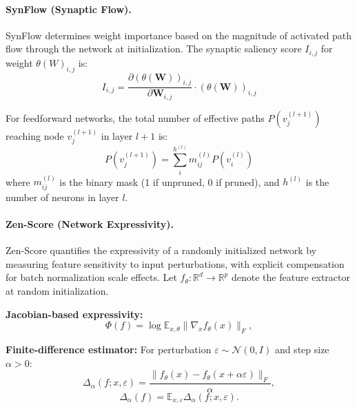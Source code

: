 \paragraph{SynFlow (Synaptic Flow). \cite{tanaka2020pruning}}
SynFlow \cite{tanaka2020pruning} determines weight importance based on the magnitude of activated path flow through the network at initialization. The synaptic saliency score $I_{i,j}$ for weight $\theta(W)_{i,j}$ is:
\begin{equation}
	I_{i,j} = \frac{\partial (\theta(\mathbf{W}))_{i,j}}{\partial \mathbf{W}_{i,j}} \cdot (\theta(\mathbf{W}))_{i,j}
\end{equation}

For feedforward networks, the total number of effective paths $P(v^{(l+1)}_j)$ reaching node $v^{(l+1)}_j$ in layer $l+1$ is:
\begin{equation}
	P(v^{(l+1)}_j) = \sum_{i}^{h^{(l)}} m^{(l)}_{ij} P(v^{(l)}_i)
\end{equation}
where $m^{(l)}_{ij}$ is the binary mask (1 if unpruned, 0 if pruned), and $h^{(l)}$ is the number of neurons in layer $l$.

\paragraph{Zen-Score (Network Expressivity). \cite{lin2021zen}}
Zen-Score \cite{lin2021zen} quantifies the expressivity of a randomly initialized network by measuring feature sensitivity to input perturbations, with explicit compensation for batch normalization scale effects. Let $f_\theta:\mathbb{R}^d\to\mathbb{R}^p$ denote the feature extractor at random initialization. 

\textbf{Jacobian-based expressivity:}
\begin{equation}\label{eq:phi}
	\Phi(f) = \log \mathbb{E}_{x,\theta}\|\nabla_x f_\theta(x)\|_F,
\end{equation}

\textbf{Finite-difference estimator:} For perturbation $\varepsilon\sim\mathcal{N}(0,I)$ and step size $\alpha>0$:
\begin{equation}\label{eq:delta}
	\Delta_{\alpha}(f; x,\varepsilon) = \frac{\| f_\theta(x) - f_\theta(x+\alpha \varepsilon)\|_F}{\alpha},
\end{equation}
\begin{equation}
	\Delta_\alpha(f) = \mathbb{E}_{x,\varepsilon} \Delta_{\alpha}(f;x,\varepsilon).
\end{equation}

